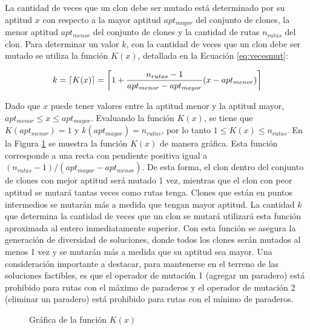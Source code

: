 La cantidad de veces que un clon debe ser mutado está determinado por su aptitud $x$ con respecto a la mayor aptitud $apt_{mayor}$ del conjunto de clones, la menor aptitud $apt_{menor}$ del conjunto de clones y la cantidad de rutas $n_{rutas}$ del clon. Para determinar un valor $k$, con la cantidad de veces que un clon debe ser mutado se utiliza la función $K(x)$, detallada en la Ecuación \eqref{eq:vecesmut}:

\begin{equation}
\label{eq:vecesmut}
k = \ceil*{K(x)} = \ceil*{ 1 + \frac{n_{rutas} - 1}{apt_{menor} - apt_{mayor}} (x- apt_{menor})}
\end{equation}

Dado que $x$ puede tener valores entre la aptitud menor y la aptitud mayor, $apt_{menor} \leq x \leq apt_{mayor}$. Evaluando la función $K(x)$, se tiene que $K(apt_{menor})=1$ y $k(apt_{mayor})=n_{rutas}$, por lo tanto $1 \leq K(x) \leq n_{rutas}$. En la Figura \ref{fig:k(x)} se muestra la función $K(x)$ de manera gráfica. Esta función corresponde a una recta con pendiente positiva igual a $(n_{rutas}-1)/(apt_{mayor}-apt_{menor})$. De esta forma, el clon dentro del conjunto de clones con mejor aptitud será mutado 1 vez, mientras que el clon con peor aptitud se mutará tantas veces como rutas tenga. Clones que están en puntos intermedios se mutarán más a medida que tengan mayor aptitud. La cantidad $k$ que determina la cantidad de veces que un clon se mutará utilizará esta función aproximada al entero inmediatamente superior. Con esta función se asegura la generación de diversidad de soluciones, donde todos los clones serán mutados al menos 1 vez y se mutarán más a medida que su aptitud sea mayor. Una consideración importante a destacar, para mantenerse en el terreno de las soluciones factibles, es que el operador de mutación 1 (agregar un paradero) está prohibido para rutas con el máximo de paraderos y el operador de mutación 2 (eliminar un paradero) está prohibido para rutas con el mínimo de paraderos.


\begin{figure}[!htb]
\begin{center}
\end{center}
\caption{Gráfica de la función $K(x)$}
\label{fig:k(x)}
\end{figure}

